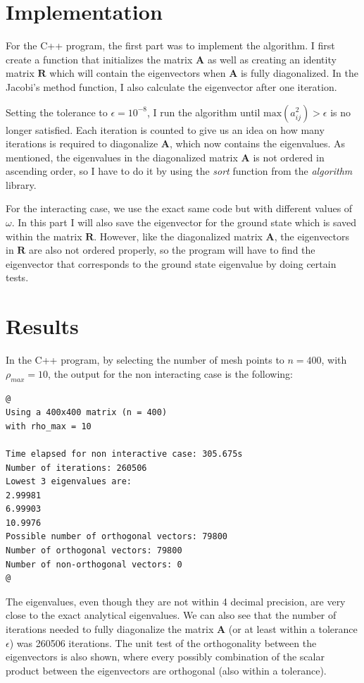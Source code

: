 \documentclass[12pt]{article}
\begin{document}
\section{Implementation}
For the C++ program, the first part was to implement the algorithm. I first create a function that initializes the matrix $\mathbf{A}$ as well as creating an identity matrix $\mathbf{R}$ which will contain the eigenvectors when $\mathbf{A}$ is fully diagonalized. In the Jacobi's method function, I also calculate the eigenvector after one iteration.

Setting the tolerance to $\epsilon = 10^{-8}$, I run the algorithm until $\text{max}(a_{ij}^2) > \epsilon$ is no longer satisfied. Each iteration is counted to give us an idea on how many iterations is required to diagonalize $\mathbf{A}$, which now contains the eigenvalues. As mentioned, the eigenvalues in the diagonalized matrix $\mathbf{A}$ is not ordered in ascending order, so I have to do it by using the \textit{sort} function from the \textit{algorithm} library.

For the interacting case, we use the exact same code but with different values of $\omega$. In this part I will also save the eigenvector for the ground state which is saved within the matrix $\mathbf{R}$. However, like the diagonalized matrix $\mathbf{A}$, the eigenvectors in $\mathbf{R}$ are also not ordered properly, so the program will have to find the eigenvector that corresponds to the ground state eigenvalue by doing certain tests. 

\section{Results}
In the C++ program, by selecting the number of mesh points to $n=400$, with $\rho_{max} = 10$, the output for the non interacting case is the following:
\begin{lstlisting}
@
Using a 400x400 matrix (n = 400)
with rho_max = 10

Time elapsed for non interactive case: 305.675s
Number of iterations: 260506
Lowest 3 eigenvalues are: 
2.99981
6.99903
10.9976
Possible number of orthogonal vectors: 79800
Number of orthogonal vectors: 79800
Number of non-orthogonal vectors: 0
@
\end{lstlisting}
The eigenvalues, even though they are not within 4 decimal precision, are very close to the exact analytical eigenvalues. We can also see that the number of iterations needed to fully diagonalize the matrix $\mathbf{A}$ (or at least within a tolerance $\epsilon$) was 260506 iterations. The unit test of the orthogonality between the eigenvectors is also shown, where every possibly combination of the scalar product between the eigenvectors are orthogonal (also within a tolerance).
\end{document}
